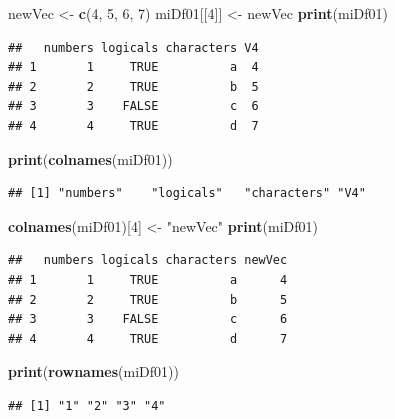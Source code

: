 \documentclass[]{book}
\newenvironment{Shaded}{\begin{snugshade}}{\end{snugshade}}
\newcommand{\KeywordTok}[1]{\textcolor[rgb]{0.13,0.29,0.53}{\textbf{#1}}}
\newcommand{\DecValTok}[1]{\textcolor[rgb]{0.00,0.00,0.81}{#1}}
\newcommand{\StringTok}[1]{\textcolor[rgb]{0.31,0.60,0.02}{#1}}
\newcommand{\NormalTok}[1]{#1}
\begin{document}
\begin{Shaded}
\begin{Highlighting}[]
\NormalTok{newVec <-}\StringTok{ }\KeywordTok{c}\NormalTok{(}\DecValTok{4}\NormalTok{, }\DecValTok{5}\NormalTok{, }\DecValTok{6}\NormalTok{, }\DecValTok{7}\NormalTok{)}
\NormalTok{miDf01[[}\DecValTok{4}\NormalTok{]] <-}\StringTok{ }\NormalTok{newVec}
\KeywordTok{print}\NormalTok{(miDf01)}
\end{Highlighting}
\end{Shaded}

\begin{verbatim}
##   numbers logicals characters V4
## 1       1     TRUE          a  4
## 2       2     TRUE          b  5
## 3       3    FALSE          c  6
## 4       4     TRUE          d  7
\end{verbatim}

\begin{Shaded}
\begin{Highlighting}[]
\KeywordTok{print}\NormalTok{(}\KeywordTok{colnames}\NormalTok{(miDf01))}
\end{Highlighting}
\end{Shaded}

\begin{verbatim}
## [1] "numbers"    "logicals"   "characters" "V4"
\end{verbatim}

\begin{Shaded}
\begin{Highlighting}[]
\KeywordTok{colnames}\NormalTok{(miDf01)[}\DecValTok{4}\NormalTok{] <-}\StringTok{ "newVec"}
\KeywordTok{print}\NormalTok{(miDf01)}
\end{Highlighting}
\end{Shaded}

\begin{verbatim}
##   numbers logicals characters newVec
## 1       1     TRUE          a      4
## 2       2     TRUE          b      5
## 3       3    FALSE          c      6
## 4       4     TRUE          d      7
\end{verbatim}

\begin{Shaded}
\begin{Highlighting}[]
\KeywordTok{print}\NormalTok{(}\KeywordTok{rownames}\NormalTok{(miDf01))}
\end{Highlighting}
\end{Shaded}

\begin{verbatim}
## [1] "1" "2" "3" "4"
\end{verbatim}
\end{document}
